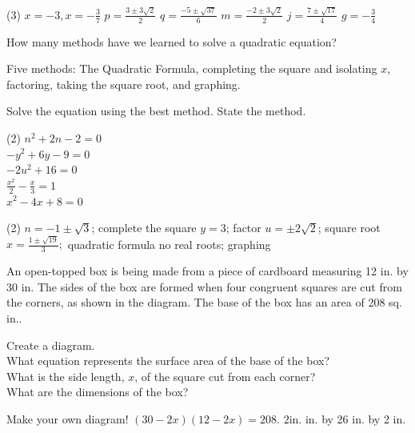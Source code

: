 \documentclass[12pt,fleqn]{book}
\newcommand{\prb}[1]{\begin{Exercise}#1\end{Exercise}}
\newcommand{\sol}[1]{\begin{Answer}#1\end{Answer}}
\begin{document}
\sol{
	\begin{tasks}(3)
		\task $x=-3, x=-\frac{3}{7}$
		\task $p=\frac{3 \pm 3 \sqrt{2}}{2}$
		\task $q=\frac{-5 \pm \sqrt{37}}{6}$
		\task $m=\frac{-2 \pm 3 \sqrt{2}}{2}$
		\task $j=\frac{7 \pm \sqrt{17}}{4}$
		\task $g=-\frac{3}{4}$
	\end{tasks}
}

\prb{How many methods have we learned to solve a quadratic equation?\\[4em]}
\sol{Five methods: The Quadratic Formula, completing the square and isolating $x$, factoring, taking the square root, and graphing.}

\prb{Solve the equation using the best method.  State the method.
	\begin{tasks}(2)
		\task $n^2+2 n-2=0$
		\\[8em]
		\task $-y^2+6 y-9=0$
		\\[8em]
		\task $-2 u^2+16=0$
		\\[8em]
		\task $\frac{x^2}{2}-\frac{x}{3}=1$
		\\[8em]
		\task $x^2-4 x+8=0$
		\\[8em]
	\end{tasks}
}
\sol{
	\begin{tasks}(2)
		\task $n=-1 \pm \sqrt{3}$; complete the square
		\task $y=3$; factor
		\task $u=\pm 2 \sqrt{2}$; square root
		\task $x=\frac{1 \pm \sqrt{19}}{3} ;$ quadratic formula
		\task no real roots; graphing
	\end{tasks}
}

\prb{An open-topped box is being made from
	a piece of cardboard measuring 12 in. by
	30 in. The sides of the box are formed
	when four congruent squares are cut from
	the corners, as shown in the diagram. The
	base of the box has an area of 208 sq. in..
	\begin{tasks}
		\task Create a diagram.
		\\[10em]
		\task What equation represents the surface area of the base of the box?
		\\[4em]
		\task What is the side length, $x$, of the square cut from each corner?
		\\[4em]
		\task What are the dimensions of the box?
		\\[4em]
	\end{tasks}
}
\sol{
	\begin{tasks}
		\task Make your own diagram!
		\task $(30-2 x)(12-2 x)=208$.
		\task $2 \mathrm{in}$.
		\task 8 in. by 26 in. by 2 in.
	\end{tasks}
}
\end{document}
